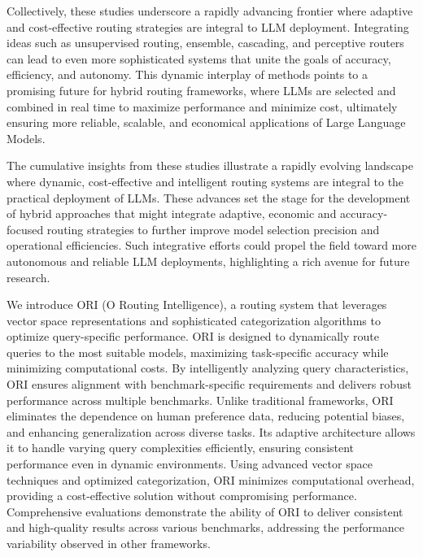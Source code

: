Collectively, these studies underscore a rapidly advancing frontier where adaptive and cost-effective routing strategies are integral to LLM deployment. Integrating ideas such as unsupervised routing, ensemble, cascading, and perceptive routers can lead to even more sophisticated systems that unite the goals of accuracy, efficiency, and autonomy. This dynamic interplay of methods points to a promising future for hybrid routing frameworks, where LLMs are selected and combined in real time to maximize performance and minimize cost, ultimately ensuring more reliable, scalable, and economical applications of Large Language Models.

The cumulative insights from these studies illustrate a rapidly evolving landscape where dynamic, cost-effective and intelligent routing systems are integral to the practical deployment of LLMs. These advances set the stage for the development of hybrid approaches that might integrate adaptive, economic and accuracy-focused routing strategies to further improve model selection precision and operational efficiencies. Such integrative efforts could propel the field toward more autonomous and reliable LLM deployments, highlighting a rich avenue for future research.


We introduce ORI (O Routing Intelligence), a routing system that leverages vector space representations and sophisticated categorization algorithms to optimize query-specific performance. ORI is designed to dynamically route queries to the most suitable models, maximizing task-specific accuracy while minimizing computational costs. By intelligently analyzing query characteristics, ORI ensures alignment with benchmark-specific requirements and delivers robust performance across multiple benchmarks. Unlike traditional frameworks, ORI eliminates the dependence on human preference data, reducing potential biases, and enhancing generalization across diverse tasks. Its adaptive architecture allows it to handle varying query complexities efficiently, ensuring consistent performance even in dynamic environments. Using advanced vector space techniques and optimized categorization, ORI minimizes computational overhead, providing a cost-effective solution without compromising performance. Comprehensive evaluations demonstrate the ability of ORI to deliver consistent and high-quality results across various benchmarks, addressing the performance variability observed in other frameworks.